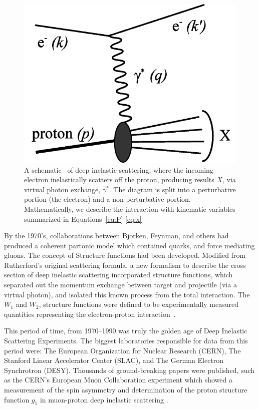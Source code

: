 \begin{figure}[ht]
	\centering
	\includegraphics[width=0.6\linewidth]{./figures/deep_inelastic_basic.png}
	\caption{
    A schematic~\cite{Ddn2_2008} of deep inelastic scattering, where the
    incoming electron inelastically scatters off the proton, producing results
    $X$, via virtual photon exchange, $\gamma^*$. The diagram is split into a
    perturbative portion (the electron) and a non-perturbative portion.
    Mathematically, we describe the interaction with kinematic variables
    summarized in Equations~\ref{eq:P}-\ref{eq:x}
  }
	\label{fig:disschematic}
\end{figure}

By the 1970's, collaborations between Bjorken, Feynman, and others had produced a
coherent partonic model which contained quarks, and force mediating gluons.  The
concept of Structure functions had been developed. Modified from Rutherford's
original scattering formula, a new formalism to describe the cross section of
deep inelastic scattering incorporated structure functions, which separated out
the momentum exchange between target and projectile (via a virtual photon), and
isolated this known process from the total interaction. The $W_1$ and $W_2$,
structure functions were defined to be experimentally measured quantities
representing the electron-proton interaction~\cite{Riordan1992}.

This period of time, from 1970--1990 was truly the golden age of Deep Inelastic
Scattering Experiments. The biggest laboratories responsible for data from this
period were: The European Organization for Nuclear Research (CERN), The Stanford
Linear Accelerator Center (SLAC), and The German Electron Synchrotron (DESY).
Thousands of ground-breaking papers were published, such as the CERN's European
Muon Collaboration experiment which showed a measurement of the spin asymmetry
and determination of the proton structure function $g_1$ in muon-proton deep
inelastic scattering \cite{Ashman1988}. 

